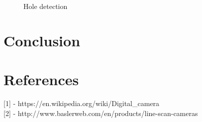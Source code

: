 \documentclass[english]{article}
\begin{document}
\begin{figure}[H]
	\centering
	\caption{Hole detection}
	\label{fig:six}
\end{figure}


\section*{Conclusion}


\section*{References}

{[}1{]} - https://en.wikipedia.org/wiki/Digital\_camera
\\
{[}2{]} - http://www.baslerweb.com/en/products/line-scan-cameras
\end{document}
